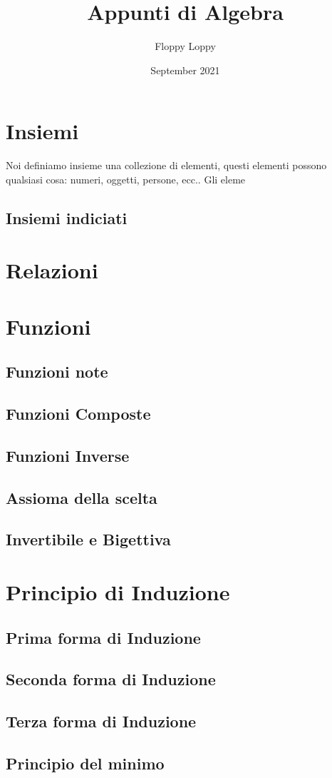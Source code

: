 \documentclass{article}
\title{Appunti di Algebra}
\author{Floppy Loppy}
\date{September 2021}
\begin{document}
\section{Insiemi}

Noi definiamo insieme una collezione di elementi, questi elementi possono qualsiasi cosa: numeri, oggetti, persone, ecc..
Gli eleme

\subsection{Insiemi indiciati}

\section{Relazioni}
\section{Funzioni}
\subsection{Funzioni note}
\subsection{Funzioni Composte}
\subsection{Funzioni Inverse}
\subsection{Assioma della scelta}
\subsection{Invertibile e Bigettiva}


\section{Principio di Induzione}
\subsection{Prima forma di Induzione}
\subsection{Seconda forma di Induzione}
\subsection{Terza forma di Induzione}
\subsection{Principio del minimo}
\end{document}
